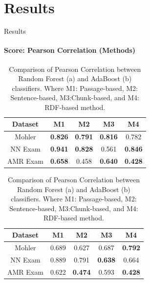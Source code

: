 \documentclass[aspectratio=169]{beamer}
\begin{document}
\section{Results}
\begin{frame}{Results}
	\framesubtitle{Score: Pearson Correlation (Methods)}
\begin{table}
	\begin{subtable}[c]{0.5\textwidth}
		\centering
		\begin{tabular}{|c|c|c|c|c|}
			\hline
			Dataset & M1 & M2 & M3 & M4 \\
			\hline
			Mohler \cite{} & \textbf{0.826}  &\textbf{0.791} &\textbf{0.816} &0.782 \\
			\hline
			NN Exam \cite{} &\textbf{0.941} &\textbf{0.828} &0.561 &\textbf{0.846} \\
			\hline
			AMR Exam \cite{} &\textbf{0.658} &0.458 &\textbf{0.640} & \textbf{0.428} \\
			\hline
		\end{tabular}
		\subcaption{}
	\end{subtable}
	\begin{subtable}[c]{0.5\textwidth}
		\centering
		\begin{tabular}{|c|c|c|c|c|}
			\hline
			Dataset & M1 & M2 & M3 & M4 \\
			\hline
			Mohler \cite{} &0.689  &0.627 &0.687 &\textbf{0.792} \\
			\hline
			NN Exam \cite{} &0.889 &0.791 &\textbf{0.638} &0.664 \\
			\hline
			AMR Exam \cite{} &0.622 &\textbf{0.474} &0.593 &\textbf{0.428} \\
			\hline
		\end{tabular}	
		\subcaption{}
	\end{subtable}
	\caption{Comparison of Pearson Correlation between Random Forest (a) and AdaBoost (b) classifiers. Where M1: Passage-based, M2: Sentence-based, M3:Chunk-based, and M4: RDF-based method.}
\end{table}
\end{frame}
\end{document}

